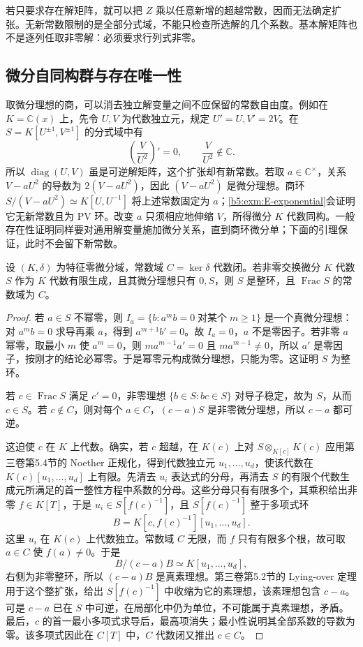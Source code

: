 \ProseParagraphBreak
若只要求存在解矩阵，就可以把 \(Z\) 乘以任意新增的超越常数，因而无法确定扩张。无新常数限制的是全部分式域，不能只检查所选解的几个系数。基本解矩阵也不是逐列任取非零解：必须要求行列式非零。

\subsection{微分自同构群与存在唯一性}
\label{b5:subsec:E02:02}

取微分理想的商，可以消去独立解变量之间不应保留的常数自由度。例如在 \(K=\mathbb C(x)\) 上，先令 \(U,V\) 为代数独立元，规定 \(U'=U,V'=2V\)。在 \(S=K[U^{\pm1},V^{\pm1}]\) 的分式域中有
\[
	\left(\frac V{U^2}\right)'=0, \qquad \frac V{U^2}\notin\mathbb C.
\]
所以 \(\operatorname{diag}(U,V)\) 虽是可逆解矩阵，这个扩张却有新常数。若取 \(a\in\mathbb C^\times\)，关系 \(V-aU^2\) 的导数为 \(2(V-aU^2)\)，因此 \((V-aU^2)\) 是微分理想。商环 \(S/(V-aU^2)\simeq K[U,U^{-1}]\) 将上述常数固定为 \(a\)；\cref{b5:exm:E-exponential}会证明它无新常数且为 PV 环。改变 \(a\) 只须相应地伸缩 \(V\)，所得微分 \(K\) 代数同构。一般存在性证明同样要对通用解变量施加微分关系，直到商环微分单；下面的引理保证，此时不会留下新常数。

\begin{lemma}\label{b5:lem:E-simple-constants}
	设 \((K,\delta)\) 为特征零微分域，常数域 \(C=\ker\delta\) 代数闭。若非零交换微分 \(K\) 代数 \(S\) 作为 \(K\) 代数有限生成，且其微分理想只有 \(0,S\)，则 \(S\) 是整环，且 \(\operatorname{Frac}S\) 的常数域为 \(C\)。
\end{lemma}
\begin{proof}
	若 \(a\in S\) 不幂零，则 \(I_a=\{b:a^mb=0\;\text{对某个}\;m\ge1\}\) 是一个真微分理想：对 \(a^mb=0\) 求导再乘 \(a\)，得到 \(a^{m+1}b'=0\)。故 \(I_a=0\)，\(a\) 不是零因子。若非零 \(a\) 幂零，取最小 \(m\) 使 \(a^m=0\)，则 \(ma^{m-1}a'=0\) 且 \(ma^{m-1}\ne0\)，所以 \(a'\) 是零因子，按刚才的结论必幂零。于是幂零元构成微分理想，只能为零。这证明 \(S\) 为整环。

	若 \(c\in\operatorname{Frac}S\) 满足 \(c'=0\)，非零理想 \(\{b\in S:bc\in S\}\) 对导子稳定，故为 \(S\)，从而 \(c\in S\)。若 \(c\notin C\)，则对每个 \(a\in C\)，\((c-a)S\) 是非零微分理想，所以 \(c-a\) 都可逆。

	这迫使 \(c\) 在 \(K\) 上代数。确实，若 \(c\) 超越，在 \(K(c)\) 上对 \(S\otimes_{K[c]}K(c)\) 应用第三卷第5.4节的 Noether 正规化，得到代数独立元 \(u_1,\ldots,u_d\)，使该代数在 \(K(c)[u_1,\ldots,u_d]\) 上有限。先清去 \(u_i\) 表达式的分母，再清去 \(S\) 的有限个代数生成元所满足的首一整性方程中系数的分母。这些分母只有有限多个，其乘积给出非零 \(f\in K[T]\)，于是 \(u_i\in S[f(c)^{-1}]\)，且 \(S[f(c)^{-1}]\) 整于多项式环
	\[
		B=K[c,f(c)^{-1}][u_1,\ldots,u_d].
	\]
	这里 \(u_i\) 在 \(K(c)\) 上代数独立。常数域 \(C\) 无限，而 \(f\) 只有有限多个根，故可取 \(a\in C\) 使 \(f(a)\ne0\)。于是
	\[
		B/(c-a)B\simeq K[u_1,\ldots,u_d],
	\]
	右侧为非零整环，所以 \((c-a)B\) 是真素理想。第三卷第5.2节的 Lying-over 定理用于这个整扩张，给出 \(S[f(c)^{-1}]\) 中收缩为它的素理想，该素理想包含 \(c-a\)。可是 \(c-a\) 已在 \(S\) 中可逆，在局部化中仍为单位，不可能属于真素理想，矛盾。最后，\(c\) 的首一最小多项式求导后，最高项消失；最小性说明其全部系数的导数为零。该多项式因此在 \(C[T]\) 中，\(C\) 代数闭又推出 \(c\in C\)。
\end{proof}

